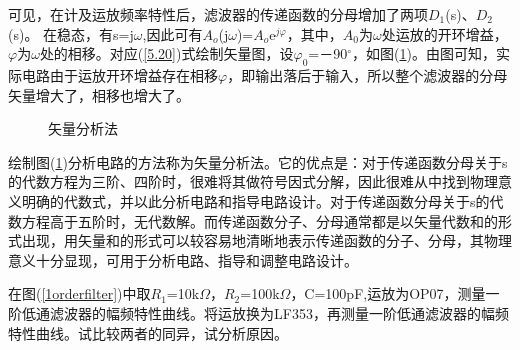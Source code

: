 \documentclass[a4paper]{article}
\begin{document}
可见，在计及运放频率特性后，滤波器的传递函数的分母增加了两项$D_1$(s)、$D_2$(s)。
在稳态，有s=j$\omega$,因此可有$A_o$(j$\omega$)=$A_o$e$^{j\varphi}$，其中，$A_0$为$\omega$处运放的开环增益，$\varphi$为$\omega$处的相移。对应(\ref{5.20})式绘制矢量图，设$\varphi_0$=－90$^\circ$，如图(\ref{vecAnalyMethod})。由图可知，实际电路由于运放开环增益存在相移$\varphi$，即输出落后于输入，所以整个滤波器的分母矢量增大了，相移也增大了。
\begin{figure}[!h]
\centering
{}
\caption{矢量分析法}\label{vecAnalyMethod}
\end{figure}
绘制图(\ref{vecAnalyMethod})分析电路的方法称为矢量分析法。它的优点是：对于传递函数分母关于s的代数方程为三阶、四阶时，很难将其做符号因式分解，因此很难从中找到物理意义明确的代数式，并以此分析电路和指导电路设计。对于传递函数分母关于s的代数方程高于五阶时，无代数解。而传递函数分子、分母通常都是以矢量代数和的形式出现，用矢量和的形式可以较容易地清晰地表示传递函数的分子、分母，其物理意义十分显现，可用于分析电路、指导和调整电路设计。

在图(\ref{1orderfilter})中取$R_1$=10k$\Omega$，$R_2$=100k$\Omega$，C=100pF,运放为OP07，测量一阶低通滤波器的幅频特性曲线。将运放换为LF353，再测量一阶低通滤波器的幅频特性曲线。试比较两者的同异，试分析原因。
\end{document}
